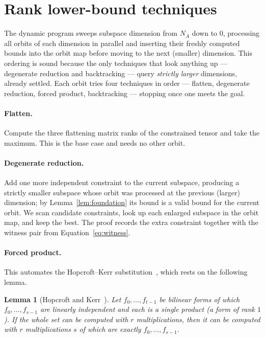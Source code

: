 \documentclass[11pt]{article}
\newtheorem{lemma}{Lemma}
\theoremstyle{definition}
\begin{document}
\section{Rank lower-bound techniques}\label{sec:techniques}

The dynamic program sweeps subspace dimension from $N_A$ down to $0$, processing all
orbits of each dimension in parallel and inserting their freshly computed bounds into
the orbit map before moving to the next (smaller) dimension. This ordering is sound
because the only techniques that look anything up --- degenerate reduction and
backtracking --- query \emph{strictly larger} dimensions, already settled. Each orbit
tries four techniques in order --- flatten, degenerate reduction, forced product,
backtracking --- stopping once one meets the goal.

\paragraph{Flatten.} Compute the three flattening matrix ranks of the constrained
tensor and take the maximum. This is
the base case and needs no other orbit.

\paragraph{Degenerate reduction.} Add one more independent constraint to the
current subspace, producing a strictly smaller subspace whose orbit was processed
at the previous (larger) dimension; by Lemma~\ref{lem:foundation} its bound is a
valid bound for the current orbit. We scan candidate constraints, look up each
enlarged subspace in the orbit map, and keep the best. The proof
records the extra constraint together with the witness pair from
Equation~\eqref{eq:witness}.

\paragraph{Forced product.} This automates the Hopcroft--Kerr substitution~\cite{hopcroft1971minimizing},
which rests on the following lemma.

\begin{lemma}[Hopcroft and Kerr~{\cite[Lemma~2]{hopcroft1971minimizing}}]\label{lem:forced-product}
  Let $f_0,\dots,f_{t-1}$ be bilinear forms of which $f_0,\dots,f_{s-1}$ are linearly
  independent and each is a single product (a form of rank $1$). If the whole set can
  be computed with $r$ multiplications, then it can be computed with $r$
  multiplications $s$ of which are exactly $f_0,\dots,f_{s-1}$.
\end{lemma}
\end{document}
